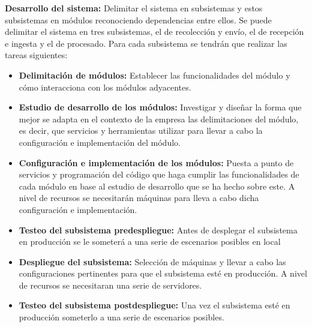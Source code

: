 \textbf{Desarrollo del sistema:} Delimitar el sistema en subsistemas y estos subsistemas en módulos reconociendo dependencias entre ellos. Se puede delimitar el sistema en tres subsistemas, el de recolección y envío, el de recepción e ingesta y el de procesado. Para cada subsistema se tendrán que realizar las tareas siguientes:
\begin{itemize}
	
	\item \textbf{Delimitación de módulos:} Establecer las funcionalidades del módulo y cómo interacciona con los módulos adyacentes.
	
	\item \textbf{Estudio de desarrollo de los módulos:} Investigar y diseñar la forma que mejor se adapta en el contexto de la empresa las delimitaciones del módulo, es decir, que servicios y herramientas utilizar para llevar a cabo la configuración e implementación del módulo.
	
	\item \textbf{Configuración e implementación de los módulos:} Puesta a punto de servicios y programación del código que haga cumplir las funcionalidades de cada módulo en base al estudio de desarrollo que se ha hecho sobre este. A nivel de recursos se necesitarán máquinas para lleva a cabo dicha configuración e implementación.
	
	\item \textbf{Testeo del subsistema predespliegue:} Antes de desplegar el subsistema en producción se le someterá a una serie de escenarios posibles en local
	
	\item \textbf{Despliegue del subsistema:} Selección de máquinas y llevar a cabo las configuraciones pertinentes para que el subsistema esté en producción. A nivel de recursos se necesitaran una serie de servidores.
	
	\item \textbf{Testeo del subsistema postdespliegue:} Una vez el subsistema esté en producción someterlo a una serie de escenarios posibles.
	
\end{itemize}


